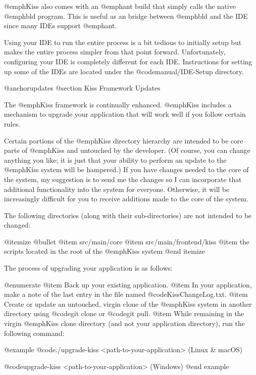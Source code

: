 @emph{Kiss} also comes with an @emph{ant} build that simply calls the
native @emph{bld} program.  This is useful as an bridge between
@emph{bld} and the IDE since many IDEs support @emph{ant}.

Using your IDE to run the entire process is a bit tedious to initially
setup but makes the entire process simpler from that point forward.
Unfortunately, configuring your IDE is completely different for each
IDE.  Instructions for setting up some of the IDEs are located under the
@code{manual/IDE-Setup} directory.


@anchor{updates} 
@section Kiss Framework Updates

The @emph{Kiss} framework is continually enhanced.  
@emph{Kiss} includes a mechanism to upgrade your application that will work well if you follow certain rules.

Certain portions of the @emph{Kiss} directory hierarchy are intended to be core parts of @emph{Kiss} and untouched by the developer.
(Of course, you can change anything you like; it is just that your ability to perform an update to the @emph{Kiss} system will be hampered.)
If you have changes needed to the core of the system, my suggestion is to send me the changes so I can incorporate that additional functionality into the system for everyone.
Otherwise, it will be increasingly difficult for you to receive additions made to the core of the system.

The following directories (along with their sub-directories) are not intended to be changed:

@itemize @bullet
@item
src/main/core
@item
src/main/frontend/kiss
@item
the scripts located in the root of the @emph{Kiss} system
@end itemize

The process of upgrading your application is as follows:

@enumerate
@item
Back up your existing application.
@item
In your application, make a note of the last entry in the file named @code{KissChangeLog.txt}.
@item
Create or update an untouched, virgin clone of the @emph{Kiss} system in another directory using 
@code{git clone} or @code{git pull}.
@item
While remaining in the virgin @emph{Kiss} clone directory (and not your application directory),
run the following command:  

@example
@code{./upgrade-kiss <path-to-your-application>}     (Linux & macOS)

@code{upgrade-kiss <path-to-your-application>}       (Windows)
@end example

